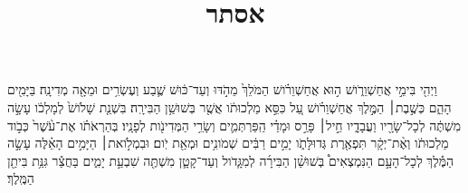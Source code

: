 \documentclass{openreader}
\title{אסתר}
\date{}
\begin{document}
\maketitle
\raggedbottom 
\fontsize{16pt}{24pt}\selectfont


וַיְהִ֖י בִּימֵ֣י אֲחַשְׁוֵרֹ֑ושׁ ה֣וּא אֲחַשְׁוֵרֹ֗ושׁ הַמֹּלֵךְ֙ מֵהֹ֣דּוּ וְעַד־כּ֔וּשׁ שֶׁ֛בַע וְעֶשְׂרִ֥ים וּמֵאָ֖ה מְדִינָֽה׃ 
בַּיָּמִ֖ים הָהֵ֑ם כְּשֶׁ֣בֶת׀ הַמֶּ֣לֶךְ אֲחַשְׁוֵרֹ֗ושׁ עַ֚ל כִּסֵּ֣א מַלְכוּתֹ֔ו אֲשֶׁ֖ר בְּשׁוּשַׁ֥ן הַבִּירָֽה׃ 
בִּשְׁנַ֤ת שָׁלֹושׁ֙ לְמָלְכֹ֔ו עָשָׂ֣ה מִשְׁתֶּ֔ה לְכָל־שָׂרָ֖יו וַעֲבָדָ֑יו חֵ֣יל׀ פָּרַ֣ס וּמָדַ֗י הַֽפַּרְתְּמִ֛ים וְשָׂרֵ֥י הַמְּדִינֹ֖ות לְפָנָֽיו׃ 
בְּהַרְאֹתֹ֗ו אֶת־עֹ֨שֶׁר֙ כְּבֹ֣וד מַלְכוּתֹ֔ו וְאֶ֨ת־יְקָ֔ר תִּפְאֶ֖רֶת גְּדוּלָּתֹ֑ו יָמִ֣ים רַבִּ֔ים שְׁמֹונִ֥ים וּמְאַ֖ת יֹֽום׃ 
וּבִמְלֹ֣ואת׀ הַיָּמִ֣ים הָאֵ֗לֶּה עָשָׂ֣ה הַמֶּ֡לֶךְ לְכָל־הָעָ֣ם הַנִּמְצְאִים֩ בְּשׁוּשַׁ֨ן הַבִּירָ֜ה לְמִגָּ֧דֹול וְעַד־קָטָ֛ן מִשְׁתֶּ֖ה שִׁבְעַ֣ת יָמִ֑ים בַּחֲצַ֕ר גִּנַּ֥ת בִּיתַ֖ן הַמֶּֽלֶךְ׃ 
\end{document}
